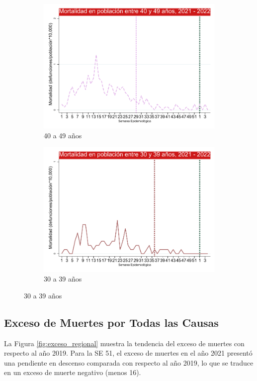 \documentclass[12pt,a4paper,openany]{book}
\begin{document}
\begin{figure}[h]
	\vspace{10mm}
	\begin{subfigure}[b]{0.45\textwidth}
		\centering
		\includegraphics[width=\textwidth]{../figuras/mortalidad_edad_40.pdf}
		\caption{40 a 49 años}
	\end{subfigure}
	\hfill
	\begin{subfigure}[b]{0.45\textwidth}
		\centering
		\includegraphics[width=\textwidth]{../figuras/mortalidad_edad_30.pdf}
		\caption{30 a 39 años}
	\end{subfigure}
	\end{figure}

\clearpage	
	\subsection*{Exceso de Muertes por Todas las Causas}
	\noindent  La Figura \ref{fig:exceso_regional} muestra la tendencia del exceso de muertes con respecto al año 2019. Para la SE 51, el exceso de muertes en el año 2021 presentó una pendiente en descenso comparada con respecto al año 2019, lo que se traduce en un exceso de muerte negativo (menos 16). 
\end{document}
